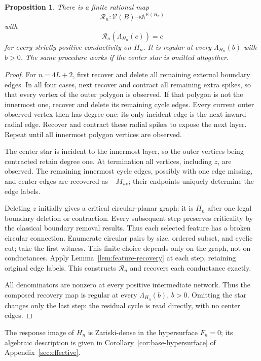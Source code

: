 \documentclass[11pt]{article}
\newtheorem{proposition}[theorem]{Proposition}
\theoremstyle{definition}
\newcommand{\Vresp}{\mathcal V}
\newcommand{\Aparam}{\mathbb A}
\newcommand{\rec}{\mathcal R}
\begin{document}
\begin{proposition}
\label{prop:base-recovery}
There is a finite rational map
\[
 \rec_n:\Vresp(B)\dashrightarrow\Aparam^{E(H_n)}
\]
with
\[
 \rec_n(\Lambda_{H_n}(c))=c
\]
for every strictly positive conductivity on \(H_n\).
It is regular at every \(\Lambda_{H_n}(b)\) with \(b>0\).
The same procedure works if the center star is omitted altogether.
\end{proposition}
\begin{proof}
For \(n=4L+2\), first recover and delete all remaining external
boundary edges. In all four cases, next recover and contract all remaining extra spikes,
so that every vertex of the outer polygon is observed.
If that polygon is not the innermost one, recover and delete its
remaining cycle edges. Every current outer observed vertex then has
degree one: its only incident edge is the next inward radial edge.
Recover and contract these radial spikes to expose the next layer.
Repeat until all innermost polygon vertices are observed.

The center star is incident to the innermost layer, so the outer
vertices being contracted retain degree one.
At termination all vertices, including \(z\), are observed.
The remaining innermost cycle edges, possibly with one edge missing,
and center edges are recovered as \(-M_{uv}\); their endpoints uniquely
determine the edge labels.

Deleting \(z\) initially gives a critical circular-planar graph:
it is \(\Pi_n\) after one legal boundary deletion or contraction.
Every subsequent step preserves criticality by the classical boundary
removal results. Thus each selected feature has a broken circular
connection. Enumerate circular pairs by size, ordered subset, and
cyclic cut; take the first witness. This finite choice depends only
on the graph, not on conductances. Apply
Lemma~\ref{lem:feature-recovery} at each step, retaining original edge
labels. This constructs \(\rec_n\) and recovers each conductance exactly.

All denominators are nonzero at every positive intermediate network.
Thus the composed recovery map is regular at every
\(\Lambda_{H_n}(b)\), \(b>0\).
Omitting the star changes only the last step:
the residual cycle is read directly, with no center edges.
\end{proof}

The response image of $H_n$ is Zariski-dense in the hypersurface $F_n=0$;
its algebraic description is given in
Corollary~\ref{cor:base-hypersurface} of Appendix~\ref{sec:effective}.
\end{document}
